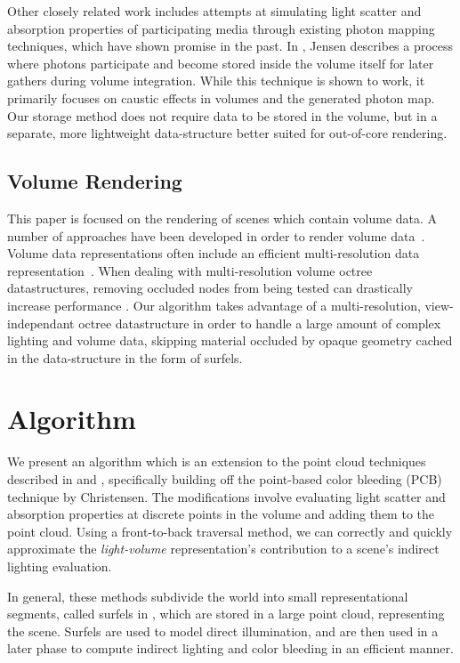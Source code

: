 \documentclass[runningheads]{llncs}
\begin{document}
Other closely related work includes attempts at simulating light scatter and absorption properties of participating media through existing photon mapping techniques, which have shown promise in the past.  In \cite{jensen:1998}, Jensen describes a process where photons participate and become stored inside the volume itself for later gathers during volume integration.  While this technique is shown to work, it primarily focuses on caustic effects in volumes and the generated photon map.  Our storage method does not require data to be stored in the volume, but in a separate, more lightweight data-structure better suited for out-of-core rendering.

\subsection{Volume Rendering}
This paper is focused on the rendering of scenes which contain volume data.  A number of approaches have been developed in order to render volume data~\cite{levoy88}\cite{Kajiya84}.  Volume data representations often include an efficient multi-resolution data representation~\cite{Westermann94}\cite{Levoy90}.  When dealing with multi-resolution volume octree datastructures, removing occluded nodes from being tested can drastically increase performance \cite{guthe}.  Our algorithm takes advantage of a multi-resolution, view-independant octree datastructure in order to handle a large amount of complex lighting and volume data, skipping material occluded by opaque geometry cached in the data-structure in the form of surfels.

\section{Algorithm}
\label{algorithm_sec}
We present an algorithm which is an extension to the point cloud techniques described in \cite{tabellion} and \cite{christensen:2008}, specifically building off the point-based color bleeding (PCB) technique by Christensen.  The modifications involve evaluating light scatter and absorption properties at discrete points in the volume and adding them to the point cloud.  Using a front-to-back traversal method, we can correctly and quickly approximate the \textit{light-volume} representation's contribution to a scene's indirect lighting evaluation.

In general, these methods subdivide the world into small representational segments, called surfels in \cite{christensen:2008}, which are stored in a large point cloud, representing the scene.  Surfels are used to model direct illumination, and are then used in a later phase to compute indirect lighting and color bleeding in an efficient manner.  
\end{document}
